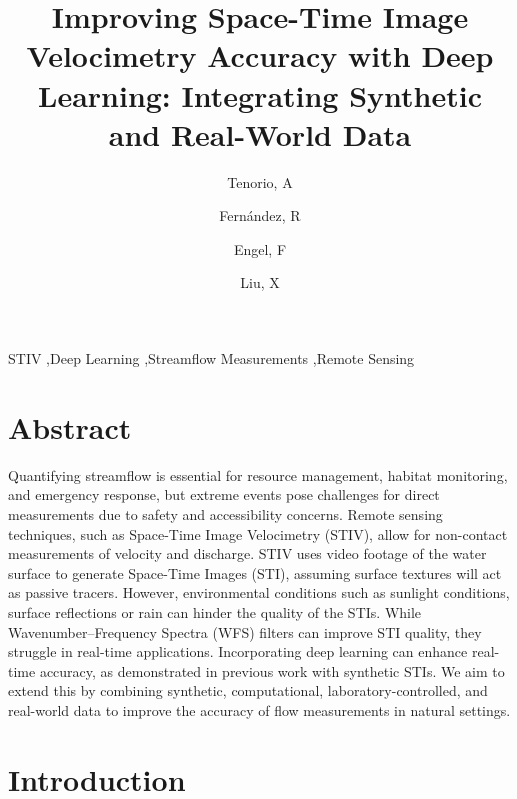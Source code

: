 \documentclass[12pt]{elsarticle}
\begin{document}
\begin{frontmatter}


\title{Improving Space-Time Image Velocimetry Accuracy with Deep Learning: Integrating Synthetic and Real-World Data}

\author[inst1]{Tenorio, A}
\author[inst1]{Fernández, R}
\author[inst2]{Engel, F}
\author[inst1]{Liu, X}



\begin{keyword}
STIV \sep Deep Learning \sep Streamflow Measurements \sep Remote Sensing
\end{keyword}

\end{frontmatter}

\linenumbers
\section*{Abstract}
Quantifying streamflow is essential for resource management, habitat monitoring, and emergency response, but extreme events pose challenges for direct measurements due to safety and accessibility concerns. Remote sensing techniques, such as Space-Time Image Velocimetry (STIV), allow for non-contact measurements of velocity and discharge. STIV uses video footage of the water surface to generate Space-Time Images (STI), assuming surface textures will act as passive tracers. However, environmental conditions such as sunlight conditions, surface reflections or rain can hinder the quality of the STIs. While Wavenumber–Frequency Spectra (WFS) filters can improve STI quality, they struggle in real-time applications. Incorporating deep learning can enhance real-time accuracy, as demonstrated in previous work with synthetic STIs. We aim to extend this by combining synthetic, computational, laboratory-controlled, and real-world data to improve the accuracy of flow measurements in natural settings.
\section{Introduction}
\end{document}
